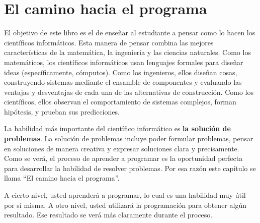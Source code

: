 

\chapter{El camino hacia el programa}

El objetivo de este libro es el de enseñar al estudiante a pensar
como lo hacen los científicos informáticos. Esta manera de
pensar combina las mejores características de la matemática, la
ingeniería y las ciencias naturales. Como los matemáticos, los
científicos informáticos usan lenguajes formales para diseñar
ideas (específicamente, cómputos). Como los ingenieros, ellos
diseñan cosas, construyendo sistemas mediante el ensamble de componentes y 
evaluando las ventajas y desventajas de cada una de las alternativas de
construcción. Como los científicos, ellos observan el comportamiento de sistemas
complejos, forman hipótesis, y prueban sus predicciones.

La habilidad más importante del científico informático es {\bf
la solución de problemas}. La solución de problemas incluye poder
formular problemas, pensar en soluciones de manera
creativa y expresar soluciones clara y precisamente. Como se
verá, el proceso de aprender a programar es la oportunidad
perfecta para desarrollar la habilidad de resolver problemas.
Por esa razón este capítulo se llama ``El camino hacia el programa''.

A cierto nivel, usted aprenderá a programar, lo cual es una
habilidad muy útil por sí misma. A otro nivel, usted utilizará la
programación para obtener algún resultado. Ese resultado se verá
más claramente durante el proceso.

